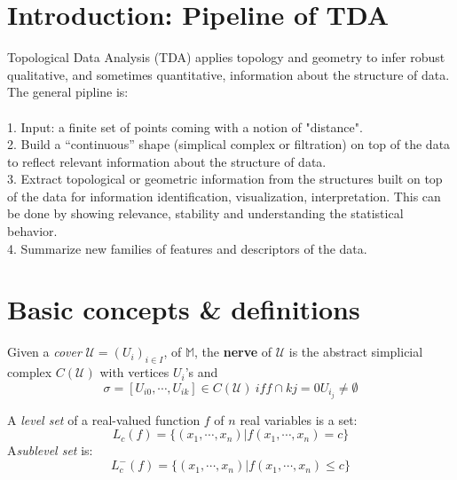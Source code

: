 ﻿\section*{Introduction: Pipeline of TDA}
Topological Data Analysis (TDA) applies topology and geometry to infer robust qualitative, and sometimes quantitative, information about the structure of data. The general pipline is:\\
 \\
1. Input: a finite set of points coming with a notion of "distance".\\
2. Build a “continuous” shape (simplical complex or filtration) on top of the data to reflect relevant information about the structure of data.\\
3. Extract topological or geometric information from the structures built on top of the data for information identification, visualization, interpretation. This can be done by showing relevance, stability and understanding the statistical behavior.\\
4. Summarize new families of features and descriptors of the data.


\section{Basic concepts \& definitions}
\theoremstyle{definition}
\begin{definition}
Given a \emph{cover} $\mathcal{U}=(U_i)_{i\in I}$, of $\mathbb{M}$, the \textbf{nerve} of $\mathcal{U}$ is the abstract simplicial complex $C(\mathcal{U})$ with vertices $U_i$'s and 
\begin{equation*}
    \sigma = [U_{i0},\cdots, U_{ik}] \in C(\mathcal{U})\  iff \cap{k}{j=0} U_{i_j} \neq \emptyset
\end{equation*}
\end{definition}

\begin{definition} 
A \textit{level set} of a real-valued function $f$ of $n$ real variables is a set:
\begin{equation*}
    L_c(f)=\{(x_1,\cdots,x_n)|f(x_1,\cdots,x_n)=c\}
\end{equation*}
A\textit{sublevel set} is:
\begin{equation*}
    L_c^-(f)=\{(x_1,\cdots,x_n)|f(x_1,\cdots,x_n)\leq c\}
\end{equation*}
\end{definition}

